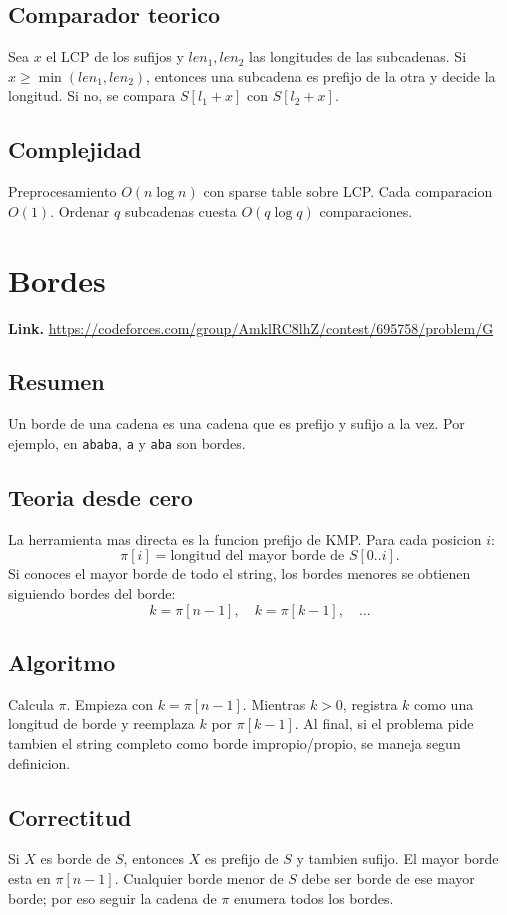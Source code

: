 \documentclass[10pt]{article}
\newcommand{\bigO}{O}
\begin{document}
\subsection*{Comparador teorico}
Sea $x$ el LCP de los sufijos y $len_1,len_2$ las longitudes de las subcadenas.
Si $x\ge \min(len_1,len_2)$, entonces una subcadena es prefijo de la otra y
decide la longitud. Si no, se compara $S[l_1+x]$ con $S[l_2+x]$.

\subsection*{Complejidad}
Preprocesamiento $\bigO(n\log n)$ con sparse table sobre LCP. Cada comparacion
$\bigO(1)$. Ordenar $q$ subcadenas cuesta $\bigO(q\log q)$ comparaciones.

\clearpage
\section{Bordes}
\textbf{Link.} \url{https://codeforces.com/group/AmklRC8lhZ/contest/695758/problem/G}

\subsection*{Resumen}
Un borde de una cadena es una cadena que es prefijo y sufijo a la vez. Por
ejemplo, en \texttt{ababa}, \texttt{a} y \texttt{aba} son bordes.

\subsection*{Teoria desde cero}
La herramienta mas directa es la funcion prefijo de KMP. Para cada posicion $i$:
\[
\pi[i] = \text{longitud del mayor borde de } S[0..i].
\]
Si conoces el mayor borde de todo el string, los bordes menores se obtienen
siguiendo bordes del borde:
\[
k=\pi[n-1],\quad k=\pi[k-1],\quad \ldots
\]

\subsection*{Algoritmo}
Calcula $\pi$. Empieza con $k=\pi[n-1]$. Mientras $k>0$, registra $k$ como una
longitud de borde y reemplaza $k$ por $\pi[k-1]$. Al final, si el problema pide
tambien el string completo como borde impropio/propio, se maneja segun definicion.

\subsection*{Correctitud}
Si $X$ es borde de $S$, entonces $X$ es prefijo de $S$ y tambien sufijo. El mayor
borde esta en $\pi[n-1]$. Cualquier borde menor de $S$ debe ser borde de ese
mayor borde; por eso seguir la cadena de $\pi$ enumera todos los bordes.
\end{document}
